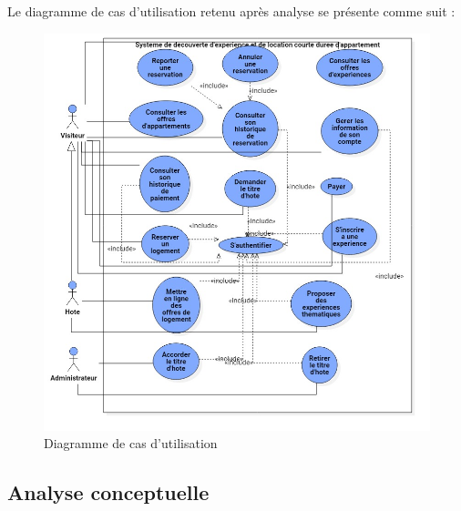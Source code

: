 \newpage
{}
Le diagramme de cas d'utilisation retenu après analyse se présente comme suit :
\begin{figure}[H]
	\begin{center}
		\includegraphics[width=18cm]{images/uml/UseCaseDiagram.jpg}
	\end{center}
	\caption{Diagramme de cas d'utilisation}
\end{figure}


\subsection{Analyse conceptuelle} 

